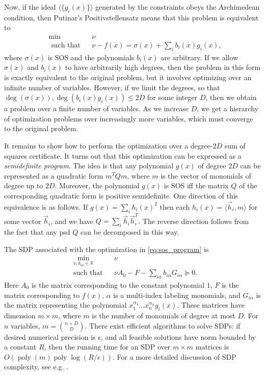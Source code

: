 \documentclass[aps,pra,notitlepage,preprintnumbers,11pt,tightenlines]{revtex4-1}
\newcommand{\RR}{\mathbb{R}}
\newcommand{\be}{\begin{equation}}
\newcommand{\ee}{\end{equation}}
\DeclareMathOperator{\poly}{poly}
\begin{document}
Now, if the ideal $\langle \{g_i(x)\} \rangle$ generated by the
constraints obeys the Archimedean condition, then
Putinar's Positivstellensatz means that this problem is equivalent to
\be \label{eq:sos_program} \begin{aligned}
  &\min && \nu \\
  &\text{ such that} && \nu - f(x) = \sigma(x) + \sum_{i} b_i(x)
  g_i(x),
  \end{aligned} 
  \ee
  where $\sigma(x)$ is SOS and the polynomials $b_i(x)$ are arbitrary.
  If we allow $\sigma(x)$ and $b_i(x)$ to have arbitrarily high
  degrees, then the problem in this form is exactly equivalent to the
  original problem, but it involves optimizing over an
  infinite number of variables. However, if we limit the degrees, so
  that $\deg(\sigma(x)), \deg(b_i(x) g_i(x)) \leq 2D$ for some integer
  $D$, then we obtain a problem over a finite number of variables. As we
  increase $D$, we get a hierarchy of optimization problems over
  increasingly more variables, which must converge to the
  original problem. 

  It remains to show how to perform the optimization over a degree-$2D$
  sum of squares certificate. It turns out that this optimization can
  be expressed as a \emph{semidefinite program}. The idea is that any
  polynomial $g(x)$ of degree $2D$ can be represented as a quadratic
  form $m^T Q m$, where $m$ is the vector of monomials of degree up to
  $2D$. Moreover, the polynomial $g(x)$ is SOS iff the matrix $Q$ of
  the corresponding quadratic form is positive semidefinite.   One
  direction of this equivalence is as follows.
  If $g(x) = \sum_i h_i(x)^2$ then each $h_i(x) = \langle \vec h_i,
  m\rangle$ for some vector $\vec h_i$, and we have $Q = \sum_i \vec
  h_i \vec h_i^T$.    The reverse direction follows from the fact that
  any psd $Q$ can be decomposed in this way.

  The SDP associated with the optimization in \eqref{eq:sos_program}
  is \be \begin{aligned}
    &\min_{\nu, b_{i\alpha} \in \RR} && \nu \\
    &\text{such that} && \nu A_0 - F - \sum_{i \alpha} b_{i\alpha}
    G_{i\alpha} \succeq 0.
    \end{aligned} \ee
    Here $A_0$ is the matrix corresponding to the constant polynomial
    $1$, $F$ is the matrix corresponding to $f(x)$, $\alpha$ is a
    multi-index labeling monomials, and $G_{i\alpha}$ is the matrix
    representing the polynomial $x_1^{\alpha_1} \dots x_n^{\alpha_n}
    g_i(x)$. These matrices have dimension $m
    \times m$, where $m$ is the number of monomials of degree at most
    $D$. For $n$ variables, $m = \binom{n + D}{D}$. There exist
    efficient algorithms to solve SDPs: if desired numerical
    precision is $\epsilon$, and all feasible solutions have norm
    bounded by a constant $R$, then the running time for an SDP over
    $m \times m$ matrices is $O(\poly(m) \poly\log(R/\epsilon))$. For
    a more detailed discussion of SDP complexity, see e.g. \cite{gls:1993}.
\end{document}
